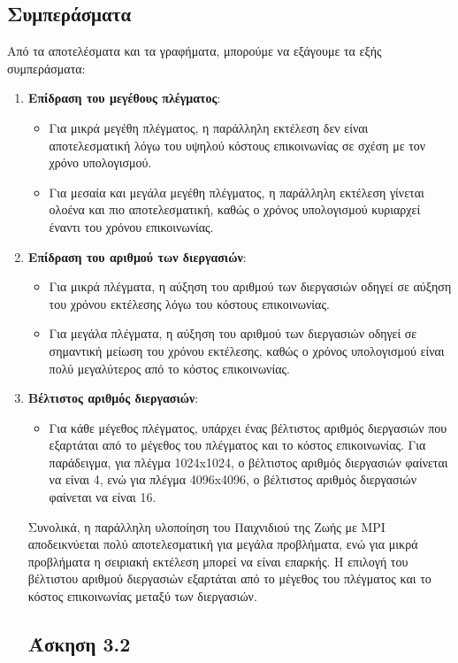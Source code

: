 \documentclass{article}
\begin{document}
\begin{enumerate}
\begin{enumerate}
\subsection*{Συμπεράσματα}
Από τα αποτελέσματα και τα γραφήματα, μπορούμε να εξάγουμε τα εξής συμπεράσματα:
\begin{enumerate}
    \item \textbf{Επίδραση του μεγέθους πλέγματος}:
    \begin{itemize}
        \item Για μικρά μεγέθη πλέγματος, η παράλληλη εκτέλεση δεν είναι αποτελεσματική λόγω του υψηλού κόστους επικοινωνίας σε σχέση με τον χρόνο υπολογισμού.
        \item Για μεσαία και μεγάλα μεγέθη πλέγματος, η παράλληλη εκτέλεση γίνεται ολοένα και πιο αποτελεσματική, καθώς ο χρόνος υπολογισμού κυριαρχεί έναντι του χρόνου επικοινωνίας.
    \end{itemize}
    \item \textbf{Επίδραση του αριθμού των διεργασιών}:
    \begin{itemize}
        \item Για μικρά πλέγματα, η αύξηση του αριθμού των διεργασιών οδηγεί σε αύξηση του χρόνου εκτέλεσης λόγω του κόστους επικοινωνίας.
        \item Για μεγάλα πλέγματα, η αύξηση του αριθμού των διεργασιών οδηγεί σε σημαντική μείωση του χρόνου εκτέλεσης, καθώς ο χρόνος υπολογισμού είναι πολύ μεγαλύτερος από το κόστος επικοινωνίας.
    \end{itemize}
    \item \textbf{Βέλτιστος αριθμός διεργασιών}:
    \begin{itemize}
        \item Για κάθε μέγεθος πλέγματος, υπάρχει ένας βέλτιστος αριθμός διεργασιών που εξαρτάται από το μέγεθος του πλέγματος και το κόστος επικοινωνίας. Για παράδειγμα, για πλέγμα 1024x1024, ο βέλτιστος αριθμός διεργασιών φαίνεται να είναι 4, ενώ για πλέγμα 4096x4096, ο βέλτιστος αριθμός διεργασιών φαίνεται να είναι 16.
    \end{itemize}
Συνολικά, η παράλληλη υλοποίηση του Παιχνιδιού της Ζωής με MPI αποδεικνύεται πολύ αποτελεσματική για μεγάλα προβλήματα, ενώ για μικρά προβλήματα η σειριακή εκτέλεση μπορεί να είναι επαρκής. Η επιλογή του βέλτιστου αριθμού διεργασιών εξαρτάται από το μέγεθος του πλέγματος και το κόστος επικοινωνίας μεταξύ των διεργασιών.
\section*{Άσκηση 3.2}

\end{enumerate}
\end{enumerate}
\end{enumerate}
\end{document}
